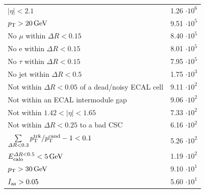 \begin{table}[!h]
{\begin{tabular}{|l|c|}
$|\eta|<2.1$                                                                              & 1.26 $\cdot10^{6 }$ \\
$p_{\text{T}}>20\,\text{Ge}\kern-0.06667em\text{V}$                                                                              & 9.51 $\cdot10^{5 }$ \\
No $\mu$ within $\Delta R<0.15$                                                           & 8.40 $\cdot10^{5 }$ \\
No e within $\Delta R<0.15$                                                               & 8.01 $\cdot10^{5 }$ \\
No $\tau$ within $\Delta R<0.15$                                                          & 7.95 $\cdot10^{5 }$ \\
No jet within $\Delta R<0.5$                                                              & 1.75 $\cdot10^{3 }$ \\
\makecell[l]{Not within $\Delta R<0.05$ of \\\hfill a dead/noisy ECAL cell}               & 9.11 $\cdot10^{2 }$ \\
Not within an ECAL  intermodule gap                                                       & 9.06 $\cdot10^{2 }$ \\
Not within $1.42<|\eta|<1.65$                                                             & 7.33 $\cdot10^{2 }$ \\
Not within $\Delta R<0.25$ to a bad CSC                                                   & 6.16 $\cdot10^{2 }$ \\
$\sum \limits_{\Delta R < 0.3} p_{\text{T}}^{\text{trk}}/p_{\text{T}}^{\text{cand}} -1 < 0.1$                         & 5.26 $\cdot10^{2 }$ \\
$E^{\Delta R<0.5}_{\text{calo}}<5\,\text{Ge}\kern-0.06667em\text{V}$                                                                            & 1.19 $\cdot10^{2 }$ \\
\midrule
$p_{\text{T}}>30\,\text{Ge}\kern-0.06667em\text{V}$                                                                              & 9.10 $\cdot10^{1 }$ \\
$I_{\text{as}}>0.05$                                                                               & 5.60 $\cdot10^{1 }$ \\
\bottomrule
\end{tabular}}
\end{table}  


\FloatBarrier
